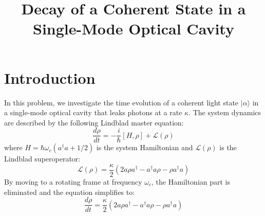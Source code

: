 \documentclass{article}
\title{Decay of a Coherent State in a Single-Mode Optical Cavity}
\author{}
\date{}
\begin{document}
\maketitle

\section{Introduction}
In this problem, we investigate the time evolution of a coherent light state $\lvert \alpha \rangle$ in a single-mode optical cavity that leaks photons at a rate $\kappa$. The system dynamics are described by the following Lindblad master equation:
\[
\frac{d\rho}{dt} = -\frac{i}{\hbar}[H, \rho] + \mathcal{L}(\rho)
\]
where $H = \hbar \omega_c (a^\dagger a + 1/2)$ is the system Hamiltonian and $\mathcal{L}(\rho)$ is the Lindblad superoperator:
\[
\mathcal{L}(\rho) = \frac{\kappa}{2} (2a\rho a^\dagger - a^\dagger a \rho - \rho a^\dagger a)
\]
By moving to a rotating frame at frequency $\omega_c$, the Hamiltonian part is eliminated and the equation simplifies to:
\begin{equation}
\frac{d\rho}{dt} = \frac{\kappa}{2} (2a\rho a^\dagger - a^\dagger a \rho - \rho a^\dagger a)
\label{eq:lindblad}
\end{equation}
\end{document}

